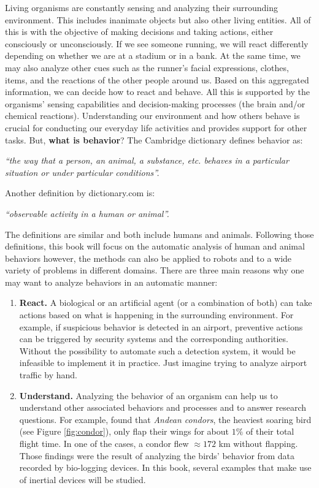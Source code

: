 \documentclass[
  11pt,
]{krantz}
\renewenvironment{quote}{\begin{VF}}{\end{VF}}
\begin{document}
Living organisms are constantly sensing and analyzing their surrounding environment. This includes inanimate objects but also other living entities. All of this is with the objective of making decisions and taking actions, either consciously or unconsciously. If we see someone running, we will react differently depending on whether we are at a stadium or in a bank. At the same time, we may also analyze other cues such as the runner's facial expressions, clothes, items, and the reactions of the other people around us. Based on this aggregated information, we can decide how to react and behave. All this is supported by the organisms' sensing capabilities and decision-making processes (the brain and/or chemical reactions). Understanding our environment and how others behave is crucial for conducting our everyday life activities and provides support for other tasks. But, \textbf{what is behavior}? The Cambridge dictionary defines behavior as:

\begin{quote}
\emph{``the way that a person, an animal, a substance, etc. behaves in a particular situation or under particular conditions''.}
\end{quote}

Another definition by dictionary.com is:

\begin{quote}
\emph{``observable activity in a human or animal''.}
\end{quote}

The definitions are similar and both include humans and animals. Following those definitions, this book will focus on the automatic analysis of human and animal behaviors however, the methods can also be applied to robots and to a wide variety of problems in different domains. There are three main reasons why one may want to analyze behaviors in an automatic manner:

\begin{enumerate}
\def\labelenumi{\arabic{enumi}.}
\item
  \textbf{React.} A biological or an artificial agent (or a combination of both) can take actions based on what is happening in the surrounding environment. For example, if suspicious behavior is detected in an airport, preventive actions can be triggered by security systems and the corresponding authorities. Without the possibility to automate such a detection system, it would be infeasible to implement it in practice. Just imagine trying to analyze airport traffic by hand.
\item
  \textbf{Understand.} Analyzing the behavior of an organism can help us to understand other associated behaviors and processes and to answer research questions. For example, \citet{williams2020} found that \emph{Andean condors}, the heaviest soaring bird (see Figure \ref{fig:condor}), only flap their wings for about \(1\%\) of their total flight time. In one of the cases, a condor flew \(\approx 172\) km without flapping. Those findings were the result of analyzing the birds' behavior from data recorded by bio-logging devices. In this book, several examples that make use of inertial devices will be studied.
\end{enumerate}
\end{document}
